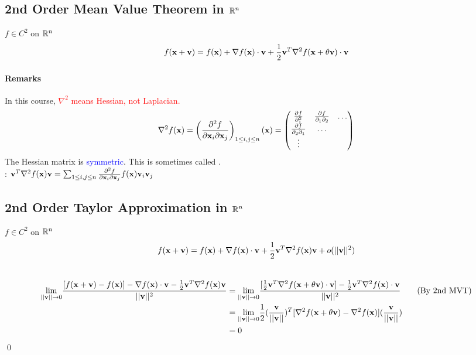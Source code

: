 \documentclass[11pt]{article}
\begin{document}
\subsection{2nd Order Mean Value Theorem in $\mathbb{R}^n$}
$f \in C^2$ on $\mathbb{R} ^n$
$$ f(\textbf{x} + \textbf{v}) = f(\textbf{x}) + \nabla f(\textbf{x}) \cdot \textbf{v} + \frac{1}{2}\textbf{v}^T\nabla^2 f(\textbf{x} + \theta \textbf{v}) \cdot \textbf{v}$$
\paragraph{Remarks}
In this course, \textcolor{red}{$\nabla^2$ means Hessian, not Laplacian.}
$$\nabla^2 f(\textbf{x}) =  \left( \frac{\partial^2 f}{\partial \textbf{x}_i \partial \textbf{x}_j}\right)_{1\leq i, j\leq n}(\textbf{x}) = \begin{pmatrix}
	\frac{\partial f}{\partial_1^2} & \frac{\partial f}{\partial_1 \partial_2} & \hdots \\
	\frac{\partial f}{\partial_2 \partial_1} & \hdots \\
	\vdots
\end{pmatrix}$$
The Hessian matrix is \textcolor{blue}{symmetric}. This is sometimes called .\\
: $\textbf{v}^T \nabla^2 f(\textbf{x})\textbf{v} = \sum_{1 \leq i, j\leq n} \frac{\partial^2 f}{\partial \textbf{x}_i \partial \textbf{x}_j}f(\textbf{x})\textbf{v}_i \textbf{v}_j$

\subsection{2nd Order Taylor Approximation in $\mathbb{R}^n$}
$f \in C^2$ on $\mathbb{R}^n$ \\
$$f(\textbf{x} + \textbf{v}) = f(\textbf{x}) + \nabla f(\textbf{x}) \cdot \textbf{v} + \frac{1}{2}\textbf{v}^T\nabla^2 f(\textbf{x}) \textbf{v} + o(||\textbf{v}||^2)$$
 \\
\begin{align*}
	\underset{||\textbf{v}|| \rightarrow 0}{\lim} \frac{[f(\textbf{x} + \textbf{v}) - f(\textbf{x})] - \nabla f(\textbf{x})\cdot \textbf{v} - \frac{1}{2} \textbf{v}^T \nabla^2 f(\textbf{x})\textbf{v}}{||\textbf{v}||^2} 
	&= \underset{||\textbf{v}|| \rightarrow 0}{\lim} \frac{[\frac{1}{2}\textbf{v}^T\nabla^2 f(\textbf{x} + \theta \textbf{v}) \cdot \textbf{v}] - \frac{1}{2}\textbf{v}^T\nabla^2 f(\textbf{x}) \cdot \textbf{v}}{||\textbf{v}||^2} \tag{By 2nd MVT}\\
	&=  \underset{||\textbf{v}|| \rightarrow 0}{\lim} \frac{1}{2}(\frac{\textbf{v}}{||\textbf{v}||})^T[\nabla^2 f(\textbf{x} + \theta \textbf{v}) - \nabla^2 f(\textbf{x})](\frac{\textbf{v}}{||\textbf{v}||}) \\
	&= 0
\end{align*}
\qed 
\end{document}
